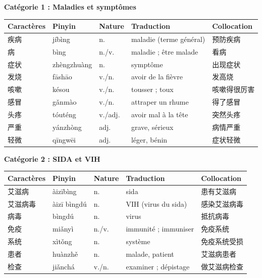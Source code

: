 \documentclass[11pt]{article}
\begin{document}
\textbf{Catégorie 1 : Maladies et symptômes}\par

\begin{center}
\begin{tabularx}{\linewidth}{|X|X|X|X|X|}
\hline
\rowcolor{popblueL} Caractères & Pinyin & Nature & Traduction & Collocation \\
\hline
疾病 & jíbìng & n. & maladie (terme général) & 预防疾病 \\
\hline
病 & bìng & n./v. & maladie ; être malade & 看病 \\
\hline
症状 & zhèngzhuàng & n. & symptôme & 出现症状 \\
\hline
发烧 & fāshāo & v./n. & avoir de la fièvre & 发高烧 \\
\hline
咳嗽 & késou & v./n. & tousser ; toux & 咳嗽得很厉害 \\
\hline
感冒 & gǎnmào & v./n. & attraper un rhume & 得了感冒 \\
\hline
头疼 & tóuténg & v./adj. & avoir mal à la tête & 突然头疼 \\
\hline
严重 & yánzhòng & adj. & grave, sérieux & 病情严重 \\
\hline
轻微 & qīngwēi & adj. & léger, bénin & 症状轻微 \\
\hline
\end{tabularx}
\end{center}

\textbf{Catégorie 2 : SIDA et VIH}\par

\begin{center}
\begin{tabularx}{\linewidth}{|X|X|X|X|X|}
\hline
\rowcolor{popblueL} Caractères & Pinyin & Nature & Traduction & Collocation \\
\hline
艾滋病 & àizībìng & n. & sida & 患有艾滋病 \\
\hline
艾滋病毒 & àizī bìngdú & n. & VIH (virus du sida) & 感染艾滋病毒 \\
\hline
病毒 & bìngdú & n. & virus & 抵抗病毒 \\
\hline
免疫 & miǎnyì & n./v. & immunité ; immuniser & 免疫系统 \\
\hline
系统 & xìtǒng & n. & système & 免疫系统受损 \\
\hline
患者 & huànzhě & n. & malade, patient & 艾滋病患者 \\
\hline
检查 & jiǎnchá & v./n. & examiner ; dépistage & 做艾滋病检查 \\
\hline
\end{tabularx}
\end{center}
\end{document}
